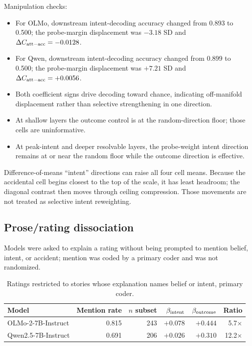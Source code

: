 Manipulation checks:
\begin{itemize}[leftmargin=*]
    \item For OLMo, downstream intent-decoding accuracy changed from 0.893 to 0.500; the probe-margin displacement was $-3.18$ SD and $\Delta C_{\mathrm{att-acc}}=-0.0128$.
    \item For Qwen, downstream intent-decoding accuracy changed from 0.899 to 0.500; the probe-margin displacement was $+7.21$ SD and $\Delta C_{\mathrm{att-acc}}=+0.0056$.
    \item Both coefficient signs drive decoding toward chance, indicating off-manifold displacement rather than selective strengthening in one direction.
    \item At shallow layers the outcome control is at the random-direction floor; those cells are uninformative.
    \item At peak-intent and deeper resolvable layers, the probe-weight intent direction remains at or near the random floor while the outcome direction is effective.
\end{itemize}

Difference-of-means ``intent'' directions can raise all four cell means.
Because the accidental cell begins closest to the top of the scale, it has least headroom; the diagonal contrast then moves through ceiling compression.
Those movements are not treated as selective intent reweighting.

\subsection{Prose/rating dissociation}

Models were asked to explain a rating without being prompted to mention belief, intent, or accident; mention was coded by a primary coder and was not randomized.

\begin{table}[h]
\centering
\small
\caption{Ratings restricted to stories whose explanation names belief or intent, primary coder.}
\label{tab:prose}
\begin{tabular}{@{}lrrrrr@{}}
\toprule
Model & Mention rate & $n$ subset & $\beta_{\mathrm{intent}}$ & $\beta_{\mathrm{outcome}}$ & Ratio \\
\midrule
OLMo-2-7B-Instruct & 0.815 & 243 & $+0.078$ & $+0.444$ & 5.7$\times$ \\
Qwen2.5-7B-Instruct & 0.691 & 206 & $+0.026$ & $+0.310$ & 12.2$\times$ \\
\bottomrule
\end{tabular}
\end{table}

